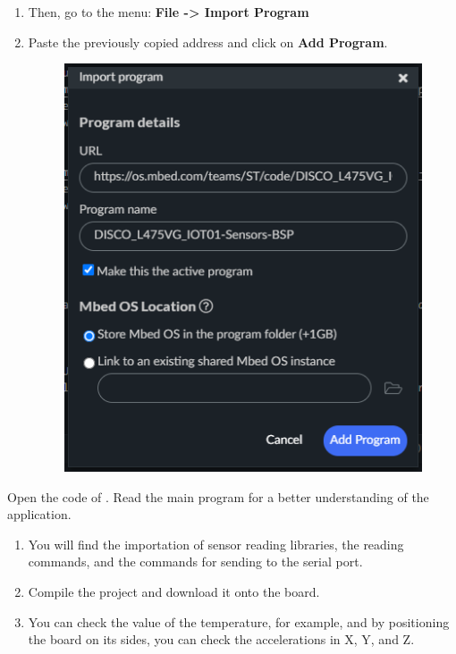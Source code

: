 \documentclass[10pt,a4paper,onecolumn]{article}
\let\textttOrig=\texttt
\def\texttt#1{\expandafter\textttOrig{\seqsplit{#1}}}
\begin{document}
\begin{enumerate}
    \item Then, go to the menu: \textbf{File -> Import Program}
    \item Paste the previously copied address and click on \textbf{Add Program}.
    
    \begin{figure}[H]
        \begin{center}
          \includegraphics[width=\dimexpr\textwidth-1cm\relax,height=\dimexpr0.25\textheight-1cm\relax,keepaspectratio]{images/9.png}
        \end{center}
    \end{figure}
\end{enumerate}

Open the code of \texttt{main.cpp}. Read the main program for a better understanding of the application.

\begin{enumerate}
    \item You will find the importation of sensor reading libraries, the reading commands, and the commands for sending to the serial port.
    \item Compile the project and download it onto the board.
    \item You can check the value of the temperature, for example, and by positioning the board on its sides, you can check the accelerations in X, Y, and Z.
\end{enumerate}
\end{document}
